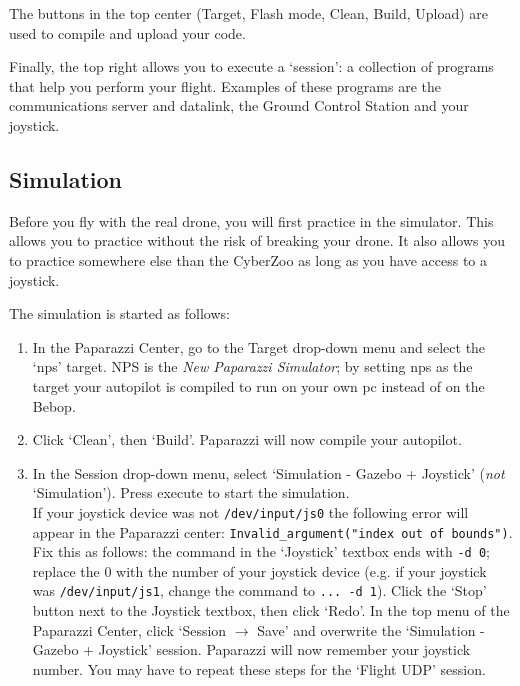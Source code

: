 \documentclass{article}
\begin{document}
The buttons in the top center (Target, Flash mode, Clean, Build, Upload) are used to compile and upload your code.

Finally, the top right allows you to execute a `session': a collection of programs that help you perform your flight. Examples of these programs are the communications server and datalink, the Ground Control Station and your joystick.



\subsection*{Simulation}
Before you fly with the real drone, you will first practice in the simulator.
This allows you to practice without the risk of breaking your drone. It also allows you to practice somewhere else than the CyberZoo as long as you have access to a joystick.

\medskip
The simulation is started as follows:
\begin{enumerate}
\item In the Paparazzi Center, go to the Target drop-down menu and select the `nps' target. NPS is the \emph{New Paparazzi Simulator}; by setting nps as the target your autopilot is compiled to run on your own pc instead of on the Bebop.
\item Click `Clean', then `Build'. Paparazzi will now compile your autopilot.
\item In the Session drop-down menu, select `Simulation - Gazebo + Joystick' (\emph{not} `Simulation'). Press execute to start the simulation.\smallskip\\
If your joystick device was not \verb"/dev/input/js0" the following error will appear in the Paparazzi center: \verb|Invalid_argument("index out of bounds")|. Fix this as follows: the command in the `Joystick' textbox ends with \verb"-d 0"; replace the 0 with the number of your joystick device (e.g. if your joystick was \verb"/dev/input/js1", change the command to \verb"... -d 1"). Click the `Stop' button next to the Joystick textbox, then click `Redo'. In the top menu of the Paparazzi Center, click `Session $\rightarrow$ Save' and overwrite the `Simulation - Gazebo + Joystick' session. Paparazzi will now remember your joystick number. You may have to repeat these steps for the `Flight UDP' session.
\end{enumerate}
\end{document}
